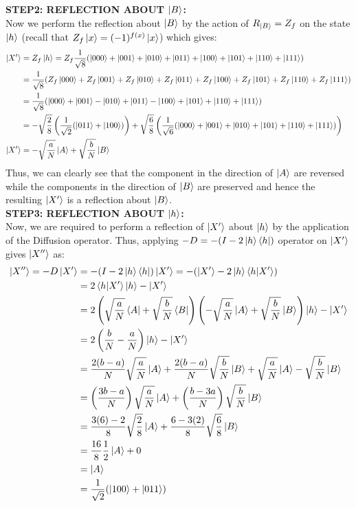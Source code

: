 \textbf{STEP2: REFLECTION ABOUT $\ket{B}$: }\\
Now we perform the reflection about $\ket{B}$ by the action of $R_{\ket{B}}=Z_f$ on the state $\ket{h}$ (recall that $Z_f\ket{x}=(-1)^{f(x)}\ket{x}$) which gives:
\begin{align*}
\ket{X'}&=Z_f\ket{h}=Z_f\frac{1}{\sqrt{8}}(\ket{000}+\ket{001}+\ket{010}+\ket{011}+\ket{100}+\ket{101}+\ket{110}+\ket{111})\\
&=\frac{1}{\sqrt{8}}(Z_f\ket{000}+Z_f\ket{001}+Z_f\ket{010}+Z_f\ket{011}+Z_f\ket{100}+Z_f\ket{101}+Z_f\ket{110}+Z_f\ket{111})\\
&=\frac{1}{\sqrt{8}}(\ket{000}+\ket{001}-\ket{010}+\ket{011}-\ket{100}+\ket{101}+\ket{110}+\ket{111})\\
&=-\sqrt{\frac{2}{8}}\left(\frac{1}{\sqrt{2}}(\ket{011}+\ket{100})\right)+\sqrt{\frac{6}{8}}\left(\frac{1}{\sqrt{6}}(\ket{000}+\ket{001}+\ket{010}+\ket{101}+\ket{110}+\ket{111})\right)\\
\ket{X'}&=-\sqrt{\frac{a}{N}}\ket{A}+\sqrt{\frac{b}{N}}\ket{B}
\end{align*}
Thus, we can clearly see that the component in the direction of $\ket{A}$ are reversed while the components in the direction of $\ket{B}$ are preserved and hence the resulting $\ket{X'}$ is a reflection about $\ket{B}$.\\
\textbf{STEP3: REFLECTION ABOUT $\ket{h}$: }\\
Now, we are required to perform a reflection of $\ket{X'}$ about $\ket{h}$ by the application of the Diffusion operator. Thus, applying $-D=-(I-2\ket{h}\bra{h})$ operator on $\ket{X'}$ gives $\ket{X''}$ as:
\begin{align*}
\ket{X''}=-D\ket{X'}&=-(I-2\ket{h}\bra{h})\ket{X'}=-(\ket{X'}-2\ket{h}\braket{h|X'})\\
&=2\braket{h|X'}\ket{h}-\ket{X'}\\
&=2\left(\sqrt{\frac{a}{N}}\bra{A}+\sqrt{\frac{b}{N}}\bra{B}\right)\left(-\sqrt{\frac{a}{N}}\ket{A}+\sqrt{\frac{b}{N}}\ket{B}\right)\ket{h}-\ket{X'}\\
&=2\left(\frac{b}{N}-\frac{a}{N}\right)\ket{h}-\ket{X'}\\
&=\frac{2(b-a)}{N} \sqrt{\frac{a}{N}} \ket{A} + \frac{2(b-a)}{N} \sqrt{\frac{b}{N}} \ket{B} + \sqrt{\frac{a}{N}}\ket{A}-\sqrt{\frac{b}{N}} \ket{B}\\
&=\left(\frac{3b-a}{N}\right)\sqrt{\frac{a}{N}}\ket{A}+\left(\frac{b-3a}{N}\right)\sqrt{\frac{b}{N}}\ket{B}\\
&=\frac{3(6)-2}{8}\sqrt{\frac{2}{8}}\ket{A}+\frac{6-3(2)}{8}\sqrt{\frac{6}{8}}\ket{B}\\
&=\frac{16}{8}\frac{1}{2}\ket{A}+0\\
&=\ket{A}\\
&=\frac{1}{\sqrt{2}}(\ket{100}+\ket{011})
\end{align*}
